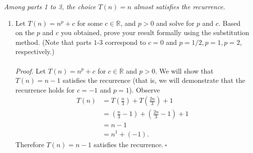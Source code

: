 \textit{Among parts 1 to 3, the choice $T(n)=n$ almost satisfies the recurrence. }

\begin{enumerate}[resume]
\item Let $T(n) = n^p + c$ for some $c \in \mathbb{R}$, and $p > 0$ and solve for $p$ and $c$. Based on the $p$ and $c$ you obtained, prove your result formally using the substitution method. (Note that parts $1$-$3$ correspond to $c=0$ and $p=1/2,p=1,p=2$, respectively.)\\
\\

\textit{Proof. }Let $T(n)=n^p+c$ for $c\in\mathbb{R}$ and $p>0$. We will show that $T(n)=n-1$ satisfies the recurrence (that is, we will demonstrate that the recurrence holds for $c=-1$ and $p=1$). Observe
\begin{align*}
T(n)&=T\left(\frac{n}{3}\right)+T\left(\frac{2n}{3}\right)+1\\
&=\left(\frac{n}{3}-1\right)+\left(\frac{2n}{3}-1\right)+1\\
&=n-1\\
&=n^1+(-1).
\end{align*}
Therefore $T(n)=n-1$ satisfies the recurrence.$~\square$
\end{enumerate}
\newpage
